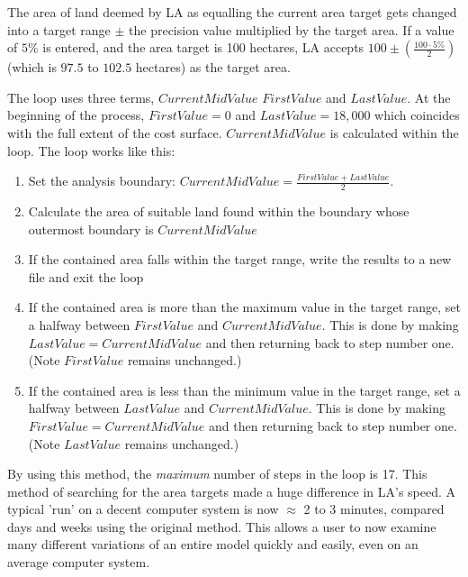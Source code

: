   The area of land deemed by LA as equalling the current area target gets
  changed into a target range $\pm$ the precision value multiplied by the 
  target area. If a value of $5\%$ is entered, and the area target is 100
  hectares, LA accepts $100 \pm(\frac{100 \cdot 5\%}{2})$ (which is $97.5$
  to $102.5$ hectares) as the target area.  

  The loop uses three terms, $CurrentMidValue$ $FirstValue$ and $LastValue$.
  At the beginning of the process, $FirstValue=0$ and $LastValue=18,000$
  which coincides with the full extent of the cost surface.  $CurrentMidValue$
  is calculated within the loop.  The loop works like this:
  \begin{enumerate} 
    \item Set the analysis boundary: $CurrentMidValue=\frac{FirstValue +
      LastValue}{2}$.  
    \item Calculate the area of suitable land found within the boundary whose
      outermost boundary is $CurrentMidValue$ 
    \item If the contained area falls within the target range, write the results
      to a new file and exit the loop 
    \item If the contained area is more than the maximum value in the target
      range, set a halfway between $FirstValue$ and $CurrentMidValue$. This is
      done by making $LastValue=CurrentMidValue$ and then returning back to step
      number one.  (Note $FirstValue$ remains unchanged.) 
    \item If the contained area is less than the minimum value in the target
      range, set a halfway between $LastValue$ and $CurrentMidValue$. This is
      done by making $FirstValue=CurrentMidValue$ and then returning back to step
      number one.  (Note $LastValue$ remains unchanged.) 
  \end{enumerate}
  By using this method, the \textit{maximum} number of steps in the loop is 17.
  This method of searching for the area targets made a huge difference in LA's
  speed.  A typical 'run' on a decent computer system is now $\approx$ 2 to 3
  minutes, compared days and weeks using the original method.  This allows a
  user to now examine many different variations of an entire model quickly and
  easily, even on an average computer system.

